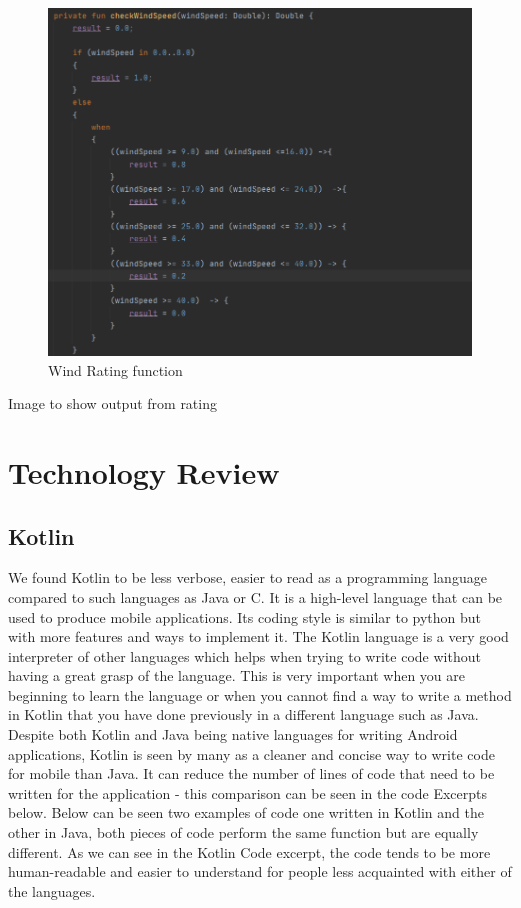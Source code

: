 \begin{figure}[H]
    \centering
    \includegraphics[width=12cm]{img/starEx.PNG}
    \caption{Wind Rating function}
    \label{fig:Wind Rating function}
\end{figure}

Image to show output from rating

\chapter{Technology Review}
\section{Kotlin}
We found Kotlin to be less verbose, easier to read as a programming language compared to such languages as Java or C. It is a high-level language that can be used to produce mobile applications. Its coding style is similar to python but with more features and ways to implement it.
\newline \newline
The Kotlin language is a very good interpreter of other languages which helps when trying to write code without having a great grasp of the \newline language. This is very important when you are beginning to learn the language or when you cannot find a way to write a method in Kotlin that you have done previously in a different language such as Java.
\newline \newline
Despite both Kotlin and Java being native languages for writing Android applications, Kotlin is seen by many as a cleaner and concise way to write code for mobile than Java. It can reduce the number of lines of code that need to be written for the application - this comparison can be seen in the code Excerpts below.
\newline
\newline
Below can be seen two examples of code one written in Kotlin and the other in Java, both pieces of code perform the same function but are equally \newline different. As we can see in the Kotlin Code excerpt, the code tends to be more human-readable and easier to understand for people less acquainted with either of the languages.
\newline

